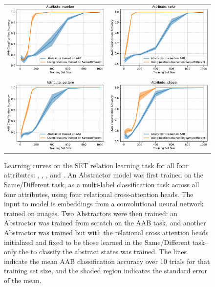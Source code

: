 \begin{figure}[t!]
	\begin{center}
	\begin{tabular}{cc}
		\includegraphics[width=.42\textwidth]{figures/set/AAB_same_different_number-crop} &
		\includegraphics[width=.42\textwidth]{figures/set/AAB_same_different_color-crop} \\
		&\\
		\includegraphics[width=.42\textwidth]{figures/set/AAB_same_different_pattern-crop} &
		\includegraphics[width=.42\textwidth]{figures/set/AAB_same_different_shape-crop}
	\end{tabular}
	\caption{Learning curves on the SET relation learning task for all four attributes: , ,
		, and .  An Abstractor model was first trained on the Same/Different task, as a multi-label classification task across all four attributes, using four relational cross-attention heads. The input to model is embeddings from a convolutional neural network trained on images. Two Abstractors were then trained: an Abstractor was trained from scratch on the AAB task, and another Abstractor was trained but with the relational cross attention heads initialized and fixed to be those learned in the Same/Different task--only the \MLP to classify the abstract states was trained. The lines indicate the mean AAB classification accuracy over 10 trials for that training set size, and the shaded region indicates the standard error of the mean.}
	\label{fig:aab_learning_curves}
    \end{center}
\end{figure}

